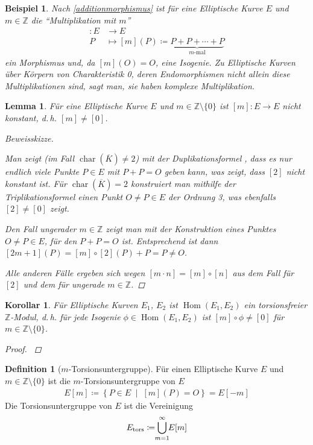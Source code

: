 \documentclass[english, german, parskip=half]{scrartcl}
\newtheorem{Lemma}[Satz]{Lemma}
\newtheorem{Korollar}[Satz]{Korollar}
\newtheorem{Beispiel}[Satz]{Beispiel}
\theoremstyle{definition}
\newtheorem{Definition}[Satz]{Definition}
\theoremstyle{remark}
\newcommand*{\Z}{\mathds{Z}}
\newcommand*{\algK}{\ensuremath{\overline K}} %
\newcommand*{\longto}{\longrightarrow}
\DeclareMathOperator{\Char}{char} %
\DeclareMathOperator{\Hom}{Hom} %
\begin{document}
\begin{Beispiel}
  Nach \autoref{additionmorphismus} ist für eine Elliptische Kurve $E$
  und $m\in\Z$ die \enquote{Multiplikation mit $m$}
  \begin{align*}
    [m]\colon E &\longto E\\
    P&\longmapsto [m](P) \coloneqq
       \underbrace{P+P+\dotsb+P}_{m\text{-mal}}
  \end{align*}
  ein Morphismus und, da $[m](O)=O$, eine Isogenie.
  Zu Elliptische Kurven über Körpern von Charakteristik 0, deren
  Endomorphismen nicht allein diese Multiplikationen sind, sagt man,
  sie haben komplexe Multiplikation.
\end{Beispiel}

\begin{Lemma}
  Für eine Elliptische Kurve $E$ und $m\in\Z\setminus\{0\}$
  ist $[m]\colon E\to E$ nicht konstant, d.\,h. $[m]\neq[0]$.
  \begin{proof}[Beweisskizze]
    \cite[siehe][Proposition 4.2 (a)]{silverman}
    
    Man zeigt (im Fall $\Char(\algK)\neq2$) mit der Duplikationsformel
    \cite[Group Law Algorithm III.2.3(d)]{silverman},
    dass es nur endlich viele Punkte $P\in E$ mit $P+P=O$ geben kann,
    was zeigt, dass $[2]$ nicht konstant ist.
    Für $\Char(\algK)=2$ konstruiert man mithilfe der
    Triplikationsformel \cite[Exercise III.3.2]{silverman}
    einen Punkt $O\neq P\in E$ der Ordnung 3, was
    ebenfalls $[2]\neq[0]$ zeigt.

    Den Fall ungerader $m\in\Z$ zeigt man mit der Konstruktion eines 
    Punktes $O\neq P\in E$, für den $P+P=O$ ist. Entsprechend ist dann
    $[2m+1](P)=[m]\circ[2](P)+P=P\neq O$.
    
    Alle anderen Fälle ergeben sich wegen 
    $[m\cdot n]=[m]\circ[n]$ aus dem Fall für $[2]$ und dem für ungerade
    $m\in\Z$.
  \end{proof}
\end{Lemma}

\begin{Korollar}
  Für Elliptische Kurven $E_1$, $E_2$ ist $\Hom(E_1,E_2)$ ein
  torsionsfreier $\Z$-Modul, d.\,h. für jede Isogenie
  $\phi\in\Hom(E_1,E_2)$ ist $[m]\circ\phi\neq[0]$ für $m\in\Z\setminus\{0\}$.
    \begin{proof}
    \cite[siehe][Proposition 4.2 (b)]{silverman}
  \end{proof}
\end{Korollar}

\begin{Definition}[$m$-Torsionsuntergruppe]
  Für einen Elliptische Kurve $E$ und $m\in\Z\setminus\{0\}$ ist die
  $m$-Torsionsuntergruppe von $E$
  \begin{gather*}
    E[m] \coloneqq \left\{ P\in E\;\middle|\; [m](P)=O\right\}
    = E[-m]
  \end{gather*}
  Die Torsionsuntergruppe von $E$ ist die Vereinigung
  \begin{gather*}
    E_\text{tors} \coloneqq \bigcup_{\mathclap{m=1}}^{\infty}E[m]
  \end{gather*}
\end{Definition}
\end{document}
